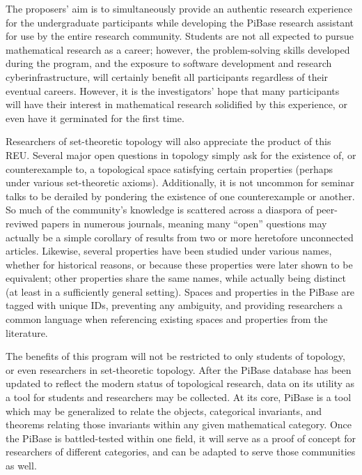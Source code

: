   The proposers' aim is to simultaneously provide an authentic research
  experience for the undergraduate participants while developing the
  PiBase research assistant for use by the entire research
  community. Students are not all expected to pursue
  mathematical research as a career; however, the problem-solving skills
  developed during the program, and the exposure to software
  development and research cyberinfrastructure, will certainly benefit all
  participants regardless of their eventual careers. However, it is
  the investigators' hope that many participants will have their interest
  in mathematical research solidified by this experience, or even have it
  germinated for the first time.

  Researchers of set-theoretic topology will also appreciate the product
  of this REU. Several major open questions in topology simply ask for
  the existence of, or counterexample to, a topological space satisfying
  certain properties (perhaps under various set-theoretic axioms).
  Additionally, it is not uncommon for seminar talks to be derailed by
  pondering the existence of one counterexample or another. So much
  of the community's knowledge is scattered across
  a diaspora of peer-reviwed papers in numerous journals, meaning many
  ``open'' questions may actually be a simple corollary of results from
  two or more heretofore unconnected articles. Likewise, several properties
  have been
  studied under various names, whether for historical reasons, or because
  these properties were later shown to be equivalent; other properties share
  the same names, while actually being distinct (at least in a sufficiently
  general setting). Spaces and properties in the PiBase are tagged with
  unique IDs, preventing any ambiguity, and providing researchers a common
  language when referencing existing spaces and properties from the literature.

  The benefits of this program will not be restricted to only students of
  topology, or even researchers in set-theoretic topology. After the
  PiBase database has been updated to reflect the modern status of topological
  research, data on its utility as a tool for students and researchers may
  be collected. At its core, PiBase is a tool which may be generalized
  to relate the objects, categorical invariants, and theorems relating those
  invariants within any given mathematical category. Once the PiBase is
  battled-tested within one field, it will serve as a proof of concept for
  researchers of different categories, and can be adapted to serve those
  communities as well.

